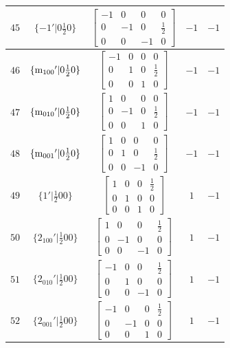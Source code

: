 \documentclass[fleqn,8pt]{jsarticle}
\begin{document}
\begin{longtable}{ccccc}
$ 45 $ & $ \{-1{}'|0 \frac{1}{2} 0\} $ & $ \begin{bmatrix} -1 & 0 & 0 & 0 \\ 0 & -1 & 0 & \frac{1}{2} \\ 0 & 0 & -1 & 0 \end{bmatrix} $ & $ -1 $ & $ -1 $ \\ \hline
$ 46 $ & $ \{{\rm m}_{100}{}'|0 \frac{1}{2} 0\} $ & $ \begin{bmatrix} -1 & 0 & 0 & 0 \\ 0 & 1 & 0 & \frac{1}{2} \\ 0 & 0 & 1 & 0 \end{bmatrix} $ & $ -1 $ & $ -1 $ \\ \hline
$ 47 $ & $ \{{\rm m}_{010}{}'|0 \frac{1}{2} 0\} $ & $ \begin{bmatrix} 1 & 0 & 0 & 0 \\ 0 & -1 & 0 & \frac{1}{2} \\ 0 & 0 & 1 & 0 \end{bmatrix} $ & $ -1 $ & $ -1 $ \\ \hline
$ 48 $ & $ \{{\rm m}_{001}{}'|0 \frac{1}{2} 0\} $ & $ \begin{bmatrix} 1 & 0 & 0 & 0 \\ 0 & 1 & 0 & \frac{1}{2} \\ 0 & 0 & -1 & 0 \end{bmatrix} $ & $ -1 $ & $ -1 $ \\ \hline
$ 49 $ & $ \{1{}'|\frac{1}{2} 0 0\} $ & $ \begin{bmatrix} 1 & 0 & 0 & \frac{1}{2} \\ 0 & 1 & 0 & 0 \\ 0 & 0 & 1 & 0 \end{bmatrix} $ & $ 1 $ & $ -1 $ \\ \hline
$ 50 $ & $ \{2{}_{100}{}'|\frac{1}{2} 0 0\} $ & $ \begin{bmatrix} 1 & 0 & 0 & \frac{1}{2} \\ 0 & -1 & 0 & 0 \\ 0 & 0 & -1 & 0 \end{bmatrix} $ & $ 1 $ & $ -1 $ \\ \hline
$ 51 $ & $ \{2{}_{010}{}'|\frac{1}{2} 0 0\} $ & $ \begin{bmatrix} -1 & 0 & 0 & \frac{1}{2} \\ 0 & 1 & 0 & 0 \\ 0 & 0 & -1 & 0 \end{bmatrix} $ & $ 1 $ & $ -1 $ \\ \hline
$ 52 $ & $ \{2{}_{001}{}'|\frac{1}{2} 0 0\} $ & $ \begin{bmatrix} -1 & 0 & 0 & \frac{1}{2} \\ 0 & -1 & 0 & 0 \\ 0 & 0 & 1 & 0 \end{bmatrix} $ & $ 1 $ & $ -1 $ \\ \hline

\end{longtable}
\end{document}
